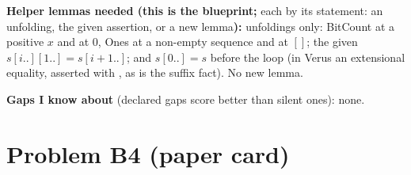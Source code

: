 \documentclass[11pt]{article}
\begin{document}
\begin{answer}
\textbf{Helper lemmas needed (this is the blueprint;} each by its statement:
an unfolding, the given assertion, or a new lemma\textbf{):} unfoldings only:
BitCount at a positive $x$ and at $0$, Ones at a non-empty sequence and at
$[]$; the given $s[i..][1..] = s[i + 1..]$; and $s[0..] = s$ before the loop
(in Verus an extensional equality, asserted with \vrs{=~=}, as is the
suffix fact). No new lemma.

\textbf{Gaps I know about} (declared gaps score better than silent ones): none.
\end{answer}

\section*{Problem B4 (paper card)}\label{ans:B4}
\end{document}
